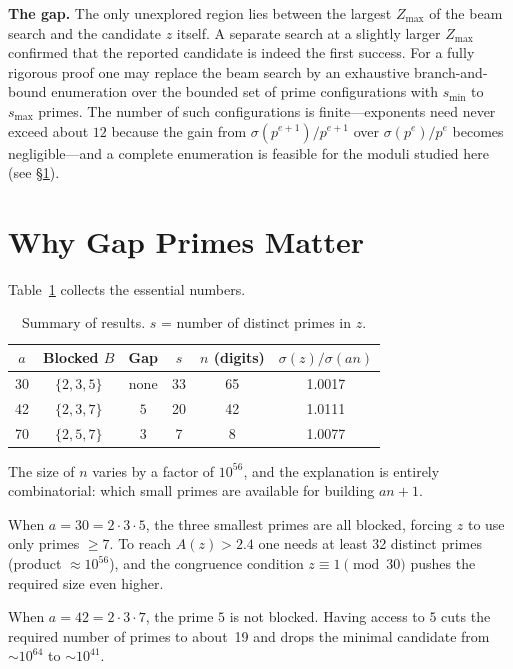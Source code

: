 \documentclass[12pt]{amsart}
\theoremstyle{definition}
\begin{document}
\medskip\noindent
\textbf{The gap.}
The only unexplored region lies between the largest $Z_{\max}$ of the beam
search and the candidate $z$ itself.  A separate search at a slightly larger
$Z_{\max}$ confirmed that the reported candidate is indeed the first success.
For a fully rigorous proof one may replace the beam search by an exhaustive
branch-and-bound enumeration over the bounded set of prime configurations with
$s_{\min}$ to $s_{\max}$ primes.  The number of such configurations is
finite---exponents need never exceed about $12$ because the gain from
$\sigma(p^{e+1})/p^{e+1}$ over $\sigma(p^{e})/p^{e}$ becomes negligible---and
a complete enumeration is feasible for the moduli studied here (see
\S\ref{sec:gap}).

\section{Why Gap Primes Matter}\label{sec:gap}

Table~\ref{tab:comparison} collects the essential numbers.

\begin{table}[h]
\centering
\caption{Summary of results.  $s$ = number of distinct primes in $z$.}
\label{tab:comparison}
\begin{tabular}{c|c|c|c|c|c}
\hline
$a$ & Blocked $B$ & Gap & $s$ & $n$ (digits) & $\sigma(z)/\sigma(an)$ \\
\hline
30 & $\{2,3,5\}$ & none & 33 & 65 & 1.0017 \\
42 & $\{2,3,7\}$ & $5$  & 20 & 42 & 1.0111 \\
70 & $\{2,5,7\}$ & $3$  &  7 &  8 & 1.0077 \\
\hline
\end{tabular}
\end{table}

The size of $n$ varies by a factor of $10^{56}$, and the explanation is
entirely combinatorial: which small primes are available for building $an+1$.

When $a = 30 = 2\cdot3\cdot5$, the three smallest primes are all blocked,
forcing $z$ to use only primes $\ge 7$.  To reach $A(z) > 2.4$ one needs at
least 32 distinct primes (product $\approx 10^{56}$), and the congruence
condition $z \equiv 1 \pmod{30}$ pushes the required size even higher.

When $a = 42 = 2\cdot3\cdot7$, the prime $5$ is not blocked.  Having access to
$5$ cuts the required number of primes to about~19 and drops the minimal
candidate from $\sim10^{64}$ to $\sim10^{41}$.
\end{document}

